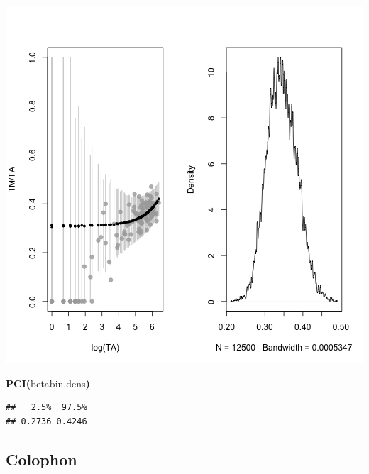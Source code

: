 \documentclass{article}
\makeatletter
\newcommand{\hlfunctioncall}[1]{\textcolor[rgb]{.5,0,.33}{\textbf{#1}}}%
\newcommand{\hlkeyword}[1]{\textbf{#1}}%
\newcommand{\hlsymbol}[1]{#1}%
\newenvironment{kframe}{%
 \def\FrameCommand##1{\hskip\@totalleftmargin \hskip-\fboxsep
 \colorbox{shadecolor}{##1}\hskip-\fboxsep
     \hskip-\linewidth \hskip-\@totalleftmargin \hskip\columnwidth}%
 \MakeFramed {\advance\hsize-\width
   \@totalleftmargin\z@ \linewidth\hsize
   \@setminipage}}%
 {\par\unskip\endMakeFramed}
\newenvironment{knitrout}{}{} %
\makeatother
\begin{document}
\begin{knitrout}
{\begin{kframe}
\includegraphics{post-bs-threes2} \begin{flushleft}
\ttfamily\noindent
\hlfunctioncall{PCI}\hlkeyword{(}\hlsymbol{betabin.dens}\hlkeyword{)}\mbox{}
\normalfont
\end{flushleft}
\begin{verbatim}
##   2.5%  97.5% 
## 0.2736 0.4246 
\end{verbatim}
\end{kframe}}
\end{knitrout}



\subsection*{Colophon}
\end{document}
